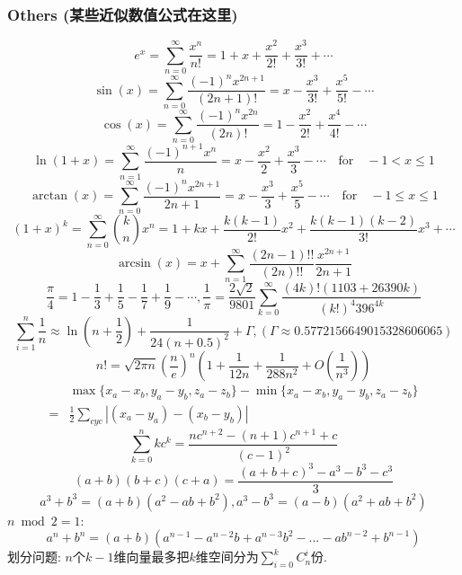 \begin{footnotesize}
\subsubsection{Others (某些近似数值公式在这里)}
\[
    e^x = \sum_{n=0}^{\infty} \frac{x^n}{n!} = 1 + x + \frac{x^2}{2!} + \frac{x^3}{3!} + \cdots
\]
\[
   \sin(x) = \sum_{n=0}^{\infty} \frac{(-1)^n x^{2n+1}}{(2n+1)!} = x - \frac{x^3}{3!} + \frac{x^5}{5!} - \cdots
\]
\[
    \cos(x) = \sum_{n=0}^{\infty} \frac{(-1)^n x^{2n}}{(2n)!} = 1 - \frac{x^2}{2!} + \frac{x^4}{4!} - \cdots
\]
\[
    \ln(1+x) = \sum_{n=1}^{\infty} \frac{(-1)^{n+1} x^n}{n} = x - \frac{x^2}{2} + \frac{x^3}{3} - \cdots \quad \text{for} \quad -1 < x \leq 1
\]
\[
    \arctan(x) = \sum_{n=0}^{\infty} \frac{(-1)^n x^{2n+1}}{2n+1} = x - \frac{x^3}{3} + \frac{x^5}{5} - \cdots \quad \text{for} \quad -1 \leq x \leq 1
\]
\[
    (1+x)^k = \sum_{n=0}^{\infty} \binom{k}{n} x^n = 1 + kx + \frac{k(k-1)}{2!} x^2 + \frac{k(k-1)(k-2)}{3!} x^3 + \cdots
\]
\[
    \arcsin(x) = x + \sum_{n=1}^{\infty} \frac{(2n-1)!!}{(2n)!!} \frac{x^{2n+1}}{2n+1}
\]
\[
   \frac{\pi}{4} = 1 - \frac{1}{3} + \frac{1}{5} - \frac{1}{7} + \frac{1}{9} - \cdots
,
   \frac{1}{\pi} = \frac{2\sqrt{2}}{9801} \sum_{k=0}^{\infty} \frac{(4k)!(1103 + 26390k)}{(k!)^4 396^{4k}}
\]
\[ \sum_{i=1}^n\frac 1n\approx\ln\left(n + \frac 1 2\right) + \frac{1}{24(n+0.5)^2}+\Gamma,(\Gamma\approx0.5772156649015328606065)\]
\[ n! = \sqrt{2\pi n}(\frac{n}{e})^n(1+\frac{1}{12n}+\frac{1}{288n^2}+O(\frac{1}{n^3})) \]
\[ \begin{aligned}
 &\max{\{x_a-x_b, y_a-y_b, z_a-z_b\}} - \min{\{x_a-x_b, y_a-y_b, z_a-z_b\}} \\
=& \frac{1}{2}\sum_{cyc}\left| (x_a-y_a)-(x_b-y_b) \right|
\end{aligned} \]
\[ \sum_{k=0}^nkc^k = \frac{nc^{n+2}-(n+1)c^{n+1}+c}{(c-1)^2} \]
\[ (a+b)(b+c)(c+a) = \frac{(a+b+c)^3 - a^3 - b^3 - c^3}{3} \]
\[ a^3+b^3=(a+b)(a^2-ab+b^2),a^3-b^3=(a-b)(a^2+ab+b^2) \]
$n\bmod 2=1:$
\[ a^n+b^n=(a+b)(a^{n-1}-a^{n-2}b+a^{n-3}b^2-...-ab^{n-2}+b^{n-1})\]
划分问题: $n$个$k-1$维向量最多把$k$维空间分为$\sum_{i=0}^{k}C_n^i$份.
\end{footnotesize}
